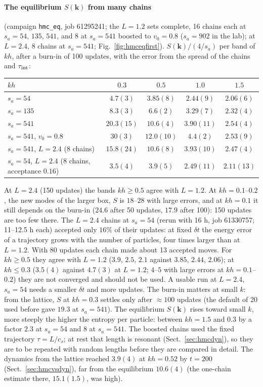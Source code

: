 \documentclass[11pt,aps,preprint,nofootinbib,superscriptaddress,tightenlines]{revtex4-2}
\def\Sect#1{Sect.~\ref{#1}}
\def\Fig#1{Fig.~\ref{#1}}
\let\oldparagraph\paragraph
\renewcommand{\paragraph}{\par\bigskip\oldparagraph}
\begin{document}
\paragraph{The equilibrium $S(\bm k)$ from many chains} (campaign \texttt{hmc\_eq}, job 61295241; the $L=1.2$ sets complete, 16 chains each at
$s_a=54$, $135$, $541$, and 8 at $s_a=541$ boosted to $v_0=0.8$ ($s_a=902$ in the lab); at $L=2.4$, 8 chains at $s_a=541$; \Fig{fig:hmceqfirst}).
$S(\bm k)/(4/s_a)$ per band of $kh$, after a burn-in of 100 updates, with the error from the spread of the chains and $\tau_{\rm int}$:
\begin{center}
\begin{tabular}{lcccc}
\hline
$kh$ & $0.3$ & $0.5$ & $1.0$ & $1.5$ \\ \hline
$s_a=54$ & $4.7(3)$ & $3.85(8)$ & $2.44(9)$ & $2.06(6)$ \\
$s_a=135$ & $8.3(3)$ & $6.6(2)$ & $3.29(7)$ & $2.32(4)$ \\
$s_a=541$ & $20.3(15)$ & $10.6(4)$ & $3.90(11)$ & $2.54(4)$ \\
$s_a=541$, $v_0=0.8$ & $30(3)$ & $12.0(10)$ & $4.4(2)$ & $2.53(9)$ \\
$s_a=541$, $L=2.4$ (8 chains) & $15.8(24)$ & $10.6(8)$ & $3.93(10)$ & $2.47(4)$ \\
$s_a=54$, $L=2.4$ (8 chains, acceptance $0.16$) & $3.5(4)$ & $3.9(5)$ & $2.49(11)$ & $2.11(13)$ \\
\hline
\end{tabular}
\end{center}
At $L=2.4$ (150 updates) the bands $kh\ge0.5$ agree with $L=1.2$.  At $kh=0.1$--$0.2$, the new modes of the larger box, $S$ is $18$--$28$
with large errors, and at $kh=0.1$ it still depends on the burn-in ($24.6$ after 50 updates, $17.9$ after 100): 150 updates are too few
there.  The $L=2.4$ chains at $s_a=54$ (rerun with 16 h, job 61330757; 11--12.5 h each) accepted only $16\%$ of their updates: at fixed
$\delta t$ the energy error of a trajectory grows with the number of particles, four times larger than at $L=1.2$.  With 80 updates each chain
made about 13 accepted moves.  For $kh\ge0.5$ they agree with $L=1.2$ ($3.9$, $2.5$, $2.1$ against $3.85$, $2.44$, $2.06$); at $kh\le0.3$
($3.5(4)$ against $4.7(3)$ at $L=1.2$; $4$--$5$ with large errors at $kh=0.1$--$0.2$) they are not converged and should not be used.  A
usable run at $L=2.4$, $s_a=54$ needs a smaller $\delta t$ and more updates.
The burn-in matters at small $k$: from the lattice, $S$ at $kh=0.3$ settles only after $\approx100$ updates (the default of 20 used before gave
$19.3$ at $s_a=541$).  The equilibrium $S(\bm k)$ rises toward small $k$, more steeply the higher the entropy per particle: between $kh=1.5$
and $0.3$ by a factor $2.3$ at $s_a=54$ and $8$ at $s_a=541$.  The boosted chains used the fixed trajectory $\tau=L/c_s$; at rest that
length is resonant (\Sect{sec:hmcdyn}), so they are to be repeated with random lengths before they are compared in detail.  The dynamics
from the lattice reached $3.9(4)$ at $kh=0.52$ by $t=200$ (\Sect{sec:hmcvsdyn}), far from the equilibrium $10.6(4)$ (the one-chain estimate
there, $15.1(1.5)$, was high).
\end{document}
